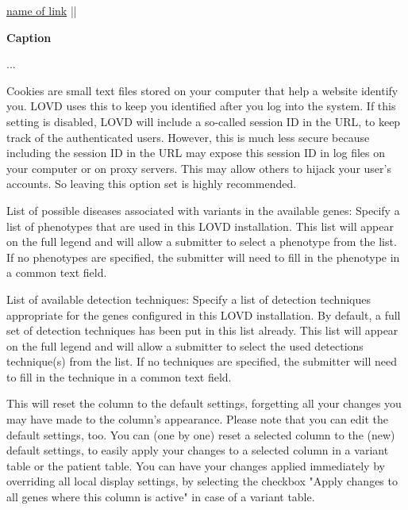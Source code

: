 \hypertarget{sec:name_of_label}{}
\hyperlink{sec:name_of_label}{name of link}
||
\label{sec:name_of_label}


\begin{infobox}
  \caption{\textbf{Caption}}
  ...
\end{infobox}

Cookies are small text files stored on your computer that help a website identify you.
LOVD uses this to keep you identified after you log into the system.
If this setting is disabled, LOVD will include a so-called session ID in the URL,
 to keep track of the authenticated users.
However, this is much less secure because including the session ID in the URL may
 expose this session ID in log files on your computer or on proxy servers.
This may allow others to hijack your user's accounts.
So leaving this option set is highly recommended.

List of possible diseases associated with variants in the available genes: Specify a list of phenotypes that are used in this LOVD installation. This list will appear on the full legend and will allow a submitter to select a phenotype from the list. If no phenotypes are specified, the submitter will need to fill in the phenotype in a common text field.

List of available detection techniques: Specify a list of detection techniques appropriate for the genes configured in this LOVD installation. By default, a full set of detection techniques has been put in this list already. This list will appear on the full legend and will allow a submitter to select the used detections technique(s) from the list. If no techniques are specified, the submitter will need to fill in the technique in a common text field.

This will reset the column to the default settings, forgetting all your changes you may have made to the column's appearance. Please note that you can edit the default settings, too.
You can (one by one) reset a selected column to the (new) default settings, to easily apply your changes to a selected column in a variant table or the patient table.
You can have your changes applied immediately by overriding all local display settings, by selecting the checkbox "Apply changes to all genes where this column is active" in case of a variant table.

